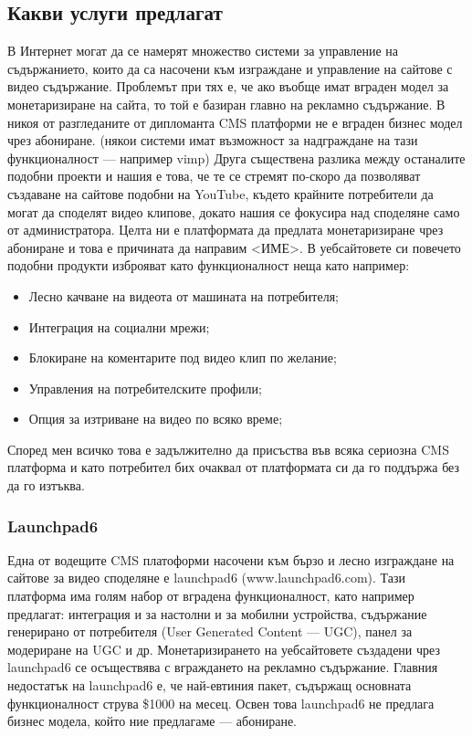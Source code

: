 \documentclass[pdftex,12pt,a4paper]{report}
\begin{document}
\subsection[Какви услуги предлагат] {Какви услуги предлагат}
В Интернет могат да се намерят множество системи за управление на съдържанието, които да са насочени към изграждане и управление на сайтове с видео съдържание. Проблемът при тях е, че ако въобще имат вграден модел за монетаризиране на сайта, то той е базиран главно на рекламно съдържание. В никоя от разгледаните от дипломанта CMS платформи не е вграден бизнес модел чрез абониране. (някои системи имат възможност за надграждане на тази функционалност — например vimp) Друга съществена разлика между останалите подобни проекти и нашия е това, че те се стремят по-скоро да позволяват създаване на сайтове подобни на YouTube, където крайните потребители да могат да споделят видео клипове, докато нашия се фокусира над споделяне само от администратора. Целта ни е платформата да предлата монетаризиране чрез абониране и това е причината да направим <ИМЕ>.
В уебсайтовете си повечето подобни продукти изброяват като функционалност неща като например:
\begin{itemize}
	\item Лесно качване на видеота от машината на потребителя;
	\item Интеграция на социални мрежи;
	\item Блокиране на коментарите под видео клип по желание;
	\item Управления на потребителските профили;
	\item Опция за изтриване на видео по всяко време;
\end{itemize}
Според мен всичко това е задължително да присъства във всяка сериозна CMS платформа и като потребител бих очаквал от платформата си да го поддържа без да го изтъква.
\subsubsection[Launchpad6]{Launchpad6}
Една от водещите CMS платоформи насочени към бързо и лесно изграждане на сайтове за видео споделяне е launchpad6 (www.launchpad6.com). Тази платформа има голям набор от вградена функционалност, като например предлагат: интеграция и за настолни и за мобилни устройства, съдържание генерирано от потребителя (User Generated Content — UGC), панел за модериране на UGC и др. Монетаризирането на уебсайтовете създадени чрез launchpad6 се осъществява с вграждането на рекламно съдържание. Главния недостатък на launchpad6 е, че най-евтиния пакет, съдържащ основната функционалност струва \$1000 на месец. Освен това launchpad6 не предлага бизнес модела, който ние предлагаме — абониране.
\end{document}
